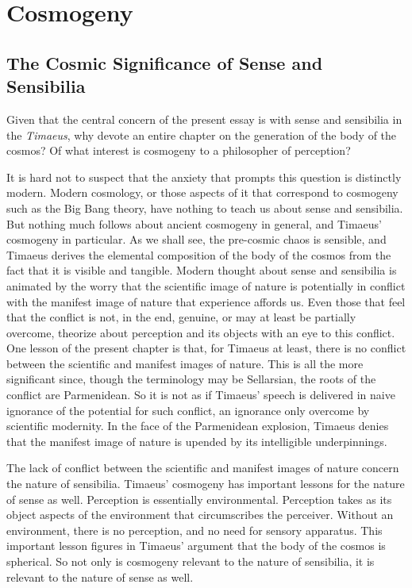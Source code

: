 \chapter{Cosmogeny} %
\label{cha:cosmogeny}

\section{The Cosmic Significance of Sense and Sensibilia} %
\label{sec:the_cosmic_significance_of_sensibilia}

Given that the central concern of the present essay is with sense and sensibilia in the \emph{Timaeus}, why devote an entire chapter on the generation of the body of the cosmos? Of what interest is cosmogeny to a philosopher of perception? 

It is hard not to suspect that the anxiety that prompts this question is distinctly modern. Modern cosmology, or those aspects of it that correspond to cosmogeny such as the Big Bang theory, have nothing to teach us about sense and sensibilia. But nothing much follows about ancient cosmogeny in general, and Timaeus' cosmogeny in particular. As we shall see, the pre-cosmic chaos is sensible, and Timaeus derives the elemental composition of the body of the cosmos from the fact that it is visible and tangible. Modern thought about sense and sensibilia is animated by the worry that the scientific image of nature is potentially in conflict with the manifest image of nature that experience affords us. Even those that feel that the conflict is not, in the end, genuine, or may at least be partially overcome, theorize about perception and its objects with an eye to this conflict. One lesson of the present chapter is that, for Timaeus at least, there is no conflict between the scientific and manifest images of nature. This is all the more significant since, though the terminology may be Sellarsian, the roots of the conflict are Parmenidean. So it is not as if Timaeus' speech is delivered in naive ignorance of the potential for such conflict, an ignorance only overcome by scientific modernity. In the face of the Parmenidean explosion, Timaeus denies that the manifest image of nature is upended by its intelligible underpinnings. 

The lack of conflict between the scientific and manifest images of nature concern the nature of sensibilia. Timaeus' cosmogeny has important lessons for the nature of sense as well. Perception is essentially environmental. Perception takes as its object aspects of the environment that circumscribes the perceiver. Without an environment, there is no perception, and no need for sensory apparatus. This important lesson figures in Timaeus' argument that the body of the cosmos is spherical. So not only is cosmogeny relevant to the nature of sensibilia, it is relevant to the nature of sense as well.

